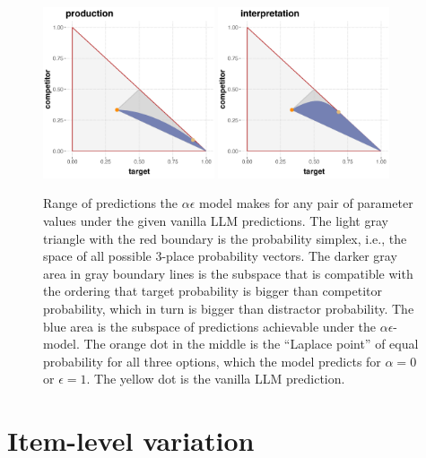 \documentclass{article}
\begin{document}
\begin{figure}[t]
  \centering

  \includegraphics[width=0.45\textwidth]{00-pics/prediction-range-prod.png}
  \includegraphics[width=0.45\textwidth]{00-pics/prediction-range-inter.png}

  \caption{
    Range of predictions the \(\alpha\epsilon\) model makes for any pair of parameter values under the given vanilla LLM predictions.
    The light gray triangle with the red boundary is the probability simplex, i.e., the space of all possible 3-place probability vectors.
    The darker gray area in gray boundary lines is the subspace that is compatible with the ordering that target probability is bigger than competitor probability, which in turn is bigger than distractor probability.
    The blue area is the subspace of predictions achievable under the $\alpha\epsilon$-model.
    The orange dot in the middle is the ``Laplace point'' of equal probability for all three options, which the model predicts for $\alpha=0$ or $\epsilon=1$.
    The yellow dot is the vanilla LLM prediction.
  }
  \label{fig:prediction-range}
\end{figure}


\newpage
{}

\newpage

\section{Item-level variation}
\label{sec:item-level-variation}
\end{document}

